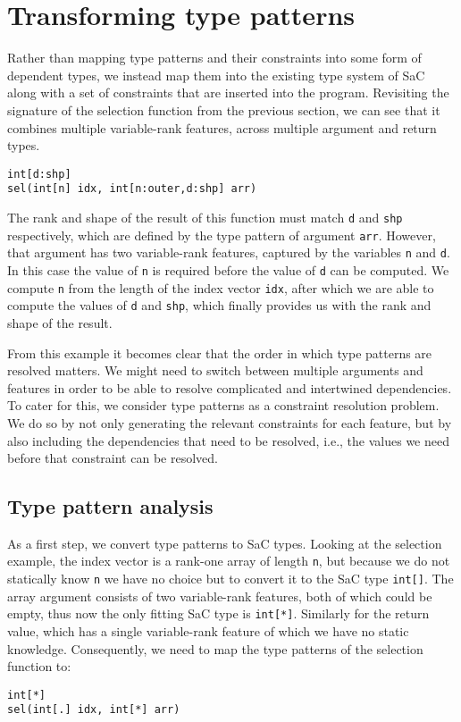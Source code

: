 \section{Transforming type patterns}

Rather than mapping type patterns and their constraints into some form of dependent types, we instead map them into the existing type system of SaC along with a set of constraints that are inserted into the program.
Revisiting the signature of the selection function from the previous section, we can see that it combines multiple variable-rank features, across multiple argument and return types.
\begin{lstlisting}
int[d:shp]
sel(int[n] idx, int[n:outer,d:shp] arr)
\end{lstlisting}

\noindent
The rank and shape of the result of this function must match \texttt{d} and \texttt{shp} respectively, which are defined by the type pattern of argument \texttt{arr}.
However, that argument has two variable-rank features, captured by the variables \texttt{n} and \texttt{d}.
In this case the value of \texttt{n} is required before the value of \texttt{d} can be computed.
We compute \texttt{n} from the length of the index vector \texttt{idx}, after which we are able to compute the values of \texttt{d} and \texttt{shp}, which finally provides us with the rank and shape of the result.

From this example it becomes clear that the order in which type patterns are resolved matters.
We might need to switch between multiple arguments and features in order to be able to resolve complicated and intertwined dependencies.
To cater for this, we consider type patterns as a constraint resolution problem.
We do so by not only generating the relevant constraints for each feature, but by also including the dependencies that need to be resolved, i.e., the values we need before that constraint can be resolved.

\subsection{Type pattern analysis}\label{sec:atp}

As a first step, we convert type patterns to SaC types.
Looking at the selection example, the index vector is a rank-one array of length \texttt{n}, but because we do not statically know \texttt{n} we have no choice but to convert it to the SaC type \texttt{int[\tpdot]}.
The array argument consists of two variable-rank features, both of which could be empty, thus now the only fitting SaC type is \texttt{int[*]}.
Similarly for the return value, which has a single variable-rank feature of which we have no static knowledge.
Consequently, we need to map the type patterns of the selection function to:
\begin{lstlisting}
int[*]
sel(int[.] idx, int[*] arr)
\end{lstlisting}

